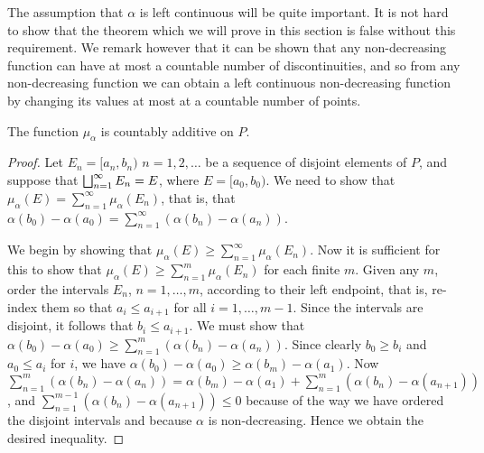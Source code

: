 The assumption that $\alpha$ is left continuous will be quite important. It is not hard to show that the theorem which we will prove in this section is false without this requirement. We remark however that it can be shown that any non-decreasing function can have at most a countable number of discontinuities, and so from any non-decreasing function we can obtain a left continuous non-decreasing function by changing its values at most at a countable number of points.

\begin{theorem}\label{thm:stieltjes sigma additive}
The function $\mu_\alpha$ is countably additive on $P$.
\end{theorem}

\begin{proof}
Let $E_n=[a_n, b_n)$ $n=1, 2, \dots$ be a sequence of disjoint elements of $P$, and suppose that $\bigsqcup_{n=1}^\infty E_n=E$, where $E=[a_0, b_0)$. We need to show that $\mu_\alpha(E)=\sum_{n=1}^\infty\mu_\alpha(E_n)$, that is, that $\alpha(b_0)-\alpha(a_0)=\sum_{n=1}^\infty(\alpha(b_n)-\alpha(a_n))$.

We begin by showing that $\mu_\alpha(E)\geq\sum_{n=1}^\infty\mu_\alpha(E_n)$. Now it is sufficient for this to show that $\mu_\alpha(E)\geq\sum_{n=1}^m\mu_\alpha(E_n)$ for each finite $m$. Given any $m$, order the intervals $E_n$, $n=1,\dots,m$, according to their left endpoint, that is, re-index them so that $a_i\leq a_{i+1}$ for all $i=1, \dots, m-1$. Since the intervals are disjoint, it follows that $b_i \leq a_{i+1}$. We must show that $\alpha(b_0)-\alpha(a_0) \geq \sum_{n=1}^m(\alpha(b_n)-\alpha(a_n))$. Since clearly $b_0 \geq b_i$ and $a_0 \leq a_i$ for $i$, we have $\alpha(b_0)-\alpha(a_0)\geq\alpha(b_m)-\alpha(a_1)$. Now $\sum_{n=1}^m(\alpha(b_n)-\alpha(a_n))=\alpha(b_m)-\alpha(a_1)+\sum_{n=1}^m(\alpha(b_n)-\alpha(a_{n+1}))$, and $\sum_{n=1}^{m-1}(\alpha(b_n)-\alpha(a_{n+1})) \leq 0$ because of the way we have ordered the disjoint intervals and because $\alpha$ is non-decreasing. Hence we obtain the desired inequality.


\end{proof}
